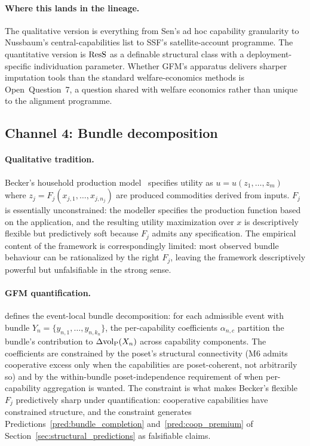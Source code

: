 \paragraph{Where this lands in the lineage.}
The qualitative version is everything from Sen's ad hoc capability
granularity to Nussbaum's central-capabilities list to SSF's
satellite-account programme.  The quantitative version is $\mathrm{ResS}$
as a definable structural class with a deployment-specific
individuation parameter.  Whether GFM's apparatus delivers
sharper imputation tools than the standard welfare-economics
methods is Open~Question~7, a question shared with welfare
economics rather than unique to the alignment programme.

\subsection{Channel 4: Bundle decomposition}
\label{sec:channel_bundles}

\paragraph{Qualitative tradition.}
Becker's household production model~\citep{becker1965theory,becker1981treatise}
specifies utility as $u = u(z_1, \dots, z_m)$ where $z_j =
F_j(x_{j,1}, \dots, x_{j,n_j})$ are produced commodities derived
from inputs.  $F_j$ is essentially unconstrained: the modeller
specifies the production function based on the application, and
the resulting utility maximization over $x$ is descriptively
flexible but predictively soft because $F_j$ admits any
specification.  The empirical content of the framework is
correspondingly limited: most observed bundle behaviour can be
rationalized by the right $F_j$, leaving the framework
descriptively powerful but unfalsifiable in the strong sense.

\paragraph{GFM quantification.}
\citep[Definition~4]{lasser2026paper8a} defines the event-local
bundle decomposition: for each admissible event with bundle $Y_n =
\{y_{n,1}, \dots, y_{n,k_n}\}$, the per-capability coefficients
$\alpha_{n,c}$ partition the bundle's contribution to
$\Delta{\operatorname{vol}_{\mathrm{P}}}(X_n)$ across capability components.  The
coefficients are constrained by the poset's structural
connectivity (M6 admits cooperative excess only when the
capabilities are poset-coherent, not arbitrarily so) and by the
within-bundle poset-independence requirement of
\citep[Theorem~2 Part~B]{lasser2026paper8a} when per-capability
aggregation is wanted.  The constraint is what makes Becker's
flexible $F_j$ predictively sharp under quantification:
cooperative capabilities have constrained structure, and the
constraint generates Predictions~\ref{pred:bundle_completion}
and~\ref{pred:coop_premium} of
Section~\ref{sec:structural_predictions} as falsifiable claims.

